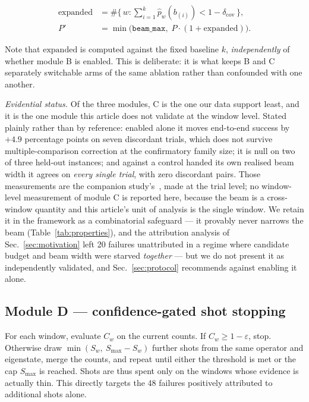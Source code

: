 \documentclass[final,5p,times,longtitle]{elsarticle}
\newcommand{\Cw}{C_w}
\newcommand{\dcov}{\delta_{\mathrm{cov}}}
\newcommand{\Smax}{S_{\max}}
\newcommand{\beammax}{\texttt{beam\_max}}
\begin{document}
\begin{align}
\mathrm{expanded} &= \#\Big\{\, w : \sum_{i=1}^{k}\hat p_w(b_{(i)}) < 1-\dcov \,\Big\},
\label{eq:expanded}\\[2pt]
P' &= \min\!\big(\beammax,\; P\cdot(1+\mathrm{expanded})\big).
\label{eq:moduleC}
\end{align}

Note that $\mathrm{expanded}$ is computed against the fixed baseline $k$,
\emph{independently} of whether module B is enabled. This is deliberate:
it is what keeps B and C separately switchable arms of the same ablation
rather than confounded with one another.

\emph{Evidential status.} Of the three modules, C is the one our data
support least, and it is the one module this article does not validate at
the window level. Stated plainly rather than by reference: enabled alone it
moves end-to-end success by $+4.9$ percentage points on seven discordant
trials, which does not survive multiple-comparison correction at the
confirmatory family size; it is null on two of three held-out instances;
and against a control handed its own realised beam width it agrees on
\emph{every single trial}, with zero discordant pairs. Those measurements
are the companion study's~\cite{companion}, made at the trial level; no
window-level measurement of module C is reported here, because the beam is
a cross-window quantity and this article's unit of analysis is the single
window. We retain it in the
framework as a combinatorial safeguard --- it provably never narrows the
beam (Table~\ref{tab:properties}), and the attribution analysis of
Sec.~\ref{sec:motivation} left 20 failures unattributed in a regime where
candidate budget and beam width were starved \emph{together} --- but we do
not present it as
independently validated, and Sec.~\ref{sec:protocol} recommends against
enabling it alone.

\subsection{Module D --- confidence-gated shot stopping}
\label{sec:moduleD}

For each window, evaluate $\Cw$ on the current counts. If
$\Cw \ge 1-\varepsilon$, stop. Otherwise draw
$\min(S_w,\ \Smax-S_w)$ further shots from the same operator and
eigenstate, merge the counts, and repeat until either the threshold is
met or the cap $\Smax$ is reached. Shots are thus spent only on the
windows whose evidence is actually thin. This directly targets the 48
failures positively attributed to additional shots alone.
\end{document}
